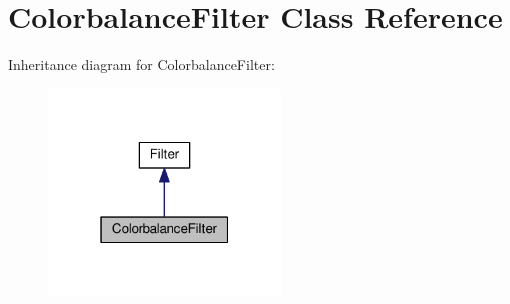 \hypertarget{classModel_1_1ColorbalanceFilter}{}\section{Colorbalance\+Filter Class Reference}
\label{classModel_1_1ColorbalanceFilter}


Inheritance diagram for Colorbalance\+Filter\+:
\nopagebreak
\begin{figure}[H]
\begin{center}
\leavevmode
\includegraphics[width=175pt]{classModel_1_1ColorbalanceFilter__inherit__graph}
\end{center}
\end{figure}
